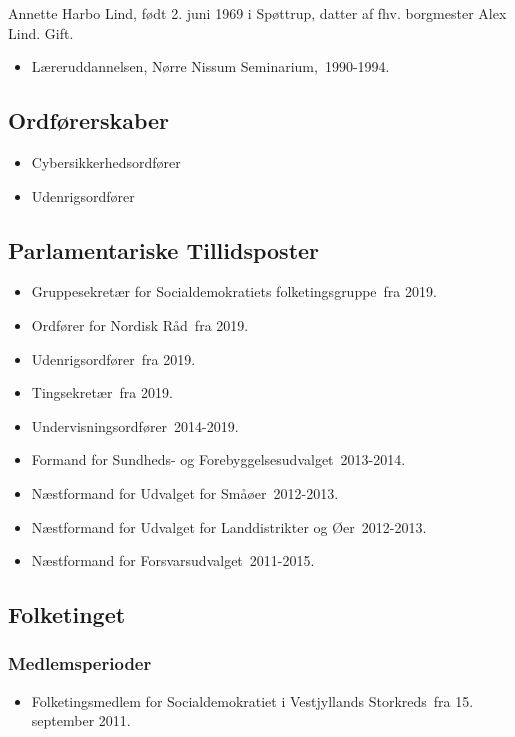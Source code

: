 \documentclass[11pt, a4paper]{awesome-cv}
\begin{document}
\makecvheader[R]
\makelettertitle
\begin{cvletter}
Annette Harbo Lind, født 2. juni 1969 i Spøttrup, datter af fhv. borgmester Alex Lind. Gift.

\begin{itemize}
\item Læreruddannelsen, Nørre Nissum Seminarium, 1990-1994.
\end{itemize}
\subsection*{Ordførerskaber}
\begin{itemize}
\item Cybersikkerhedsordfører
\item Udenrigsordfører
\end{itemize}
\subsection*{Parlamentariske Tillidsposter}
\begin{itemize}
\item Gruppesekretær for Socialdemokratiets folketingsgruppe fra 2019.
\item Ordfører for Nordisk Råd fra 2019.
\item Udenrigsordfører fra 2019.
\item Tingsekretær fra 2019.
\item Undervisningsordfører 2014-2019.
\item Formand for Sundheds- og Forebyggelsesudvalget 2013-2014.
\item Næstformand for Udvalget for Småøer 2012-2013.
\item Næstformand for Udvalget for Landdistrikter og Øer 2012-2013.
\item Næstformand for Forsvarsudvalget 2011-2015.
\end{itemize}
\subsection*{Folketinget}
\subsubsection*{Medlemsperioder}
\begin{itemize}
\item Folketingsmedlem for Socialdemokratiet i Vestjyllands Storkreds fra 15. september 2011.
\end{itemize}

\end{cvletter}
\end{document}
